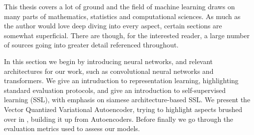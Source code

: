 \documentclass[../../thesis.tex]{subfiles}
\begin{document}
This thesis covers a lot of ground and the field of machine learning draws on many parts of mathematics, statistics and computational sciences. As much as the author would love deep diving into every aspect, certain sections are somewhat superficial. There are though, for the interested reader, a large number of sources going into greater detail referenced throughout. \newline

In this section we begin by introducing neural networks, and relevant architectures for our work, such as convolutional neural networks and transformers. We give an intruduction to representation learning, highlighting standard evaluation protocols, and give an introduction to self-supervised learning (SSL), with emphasis on siamese architecture-based SSL. We present the Vector Quantized Variational Autoencoder, trying to highlight aspects brushed over in \cite{VQVAE}, building it up from Autoencoders. Before finally we go through the evaluation metrics used to assess our models.







\end{document}
